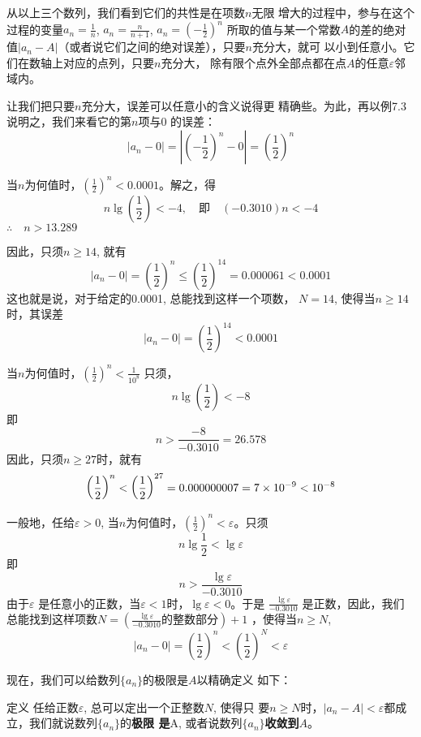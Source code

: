从以上三个数列，我们看到它们的共性是在项数$n$无限
增大的过程中，参与在这个过程的变量$a_n=\frac{1}{n}$, $a_n=\frac{n}{n+1}$, 
$a_n=\left(-\frac{1}{2}\right)^n$
所取的值与某一个常数$A$的差的绝对值$|a_n-
A|$（或者说它们之间的绝对误差），只要$n$充分大，就可
以小到任意小。它们在数轴上对应的点列，只要$n$充分大，
除有限个点外全部点都在点$A$的任意$\varepsilon$邻域内。

让我们把只要$n$充分大，误差可以任意小的含义说得更
精确些。为此，再以例7.3说明之，我们来看它的第$n$项与0
的误差：
\[|a_n-0|=\left|\left(-\frac{1}{2}\right)^n-0\right|=\left(\frac{1}{2}\right)^n\]

当$n$为何值时，$\left(\frac{1}{2}\right)^n<0.0001$。解之，得
\[n\lg\left(\frac{1}{2}\right)<-4,\quad \text{即}\quad (-0.3010)n<-4\]
$\therefore\quad n>13.289$

因此，只须$n\ge 14$, 就有
\[|a_n-0|=\left(\frac{1}{2}\right)^n\le \left(\frac{1}{2}\right)^{14}=0.000061<0.0001\]
这也就是说，对于给定的0.0001, 总能找到这样一个项数，
$N=14$, 使得当$n\ge14$时，其误差
\[|a_n-0|=\left(\frac{1}{2}\right)^{14}<0.0001\]

当$n$为何值时，$\left(\frac{1}{2}\right)^n<\frac{1}{10^8}$
只须，
\[n\lg\left(\frac{1}{2}\right)<-8\]
即
\[n>\frac{-8}{-0.3010}=26.578\]
因此，只须$n\ge 27$时，就有
\[\left(\dfrac{1}{2}\right)^n<\left(\dfrac{1}{2}\right)^{27}=0.000000007=7\times 10^{-9}<10^{-8}\]

一般地，任给$\varepsilon >0$, 当$n$为何值时，$\left(\frac{1}{2}\right)^n<\varepsilon$。只须
\[n\lg \frac{1}{2}<\lg\varepsilon\] 
即
\[n>\frac{\lg\varepsilon}{-0.3010}\]
由于$\varepsilon$ 是任意小的正数，当$\varepsilon <1$时，$\lg\varepsilon <0$。于是
$\frac{\lg\varepsilon}{-0.3010}$
是正数，因此，我们总能找到这样项数$N=\left(\frac{\lg\varepsilon}{-0.3010}\text{的整数部分}\right)+1$
，使得当$n\ge N$,
\[|a_n-0|=\left(\frac{1}{2}\right)^n<\left(\frac{1}{2}\right)^N<\varepsilon  \]

现在，我们可以给数列$\{a_n\}$的极限是$A$以精确定义
如下：

\begin{blk}{定义}
    任给正数$\varepsilon$, 总可以定出一个正整数$N$, 使得只
要$n\ge N$时，$|a_n-A|<\varepsilon$都成立，我们就说数列$\{a_n\}$的\textbf{极限
是}A, 或者说数列$\{a_n\}$\textbf{收敛到}$A$。
\end{blk}
 
